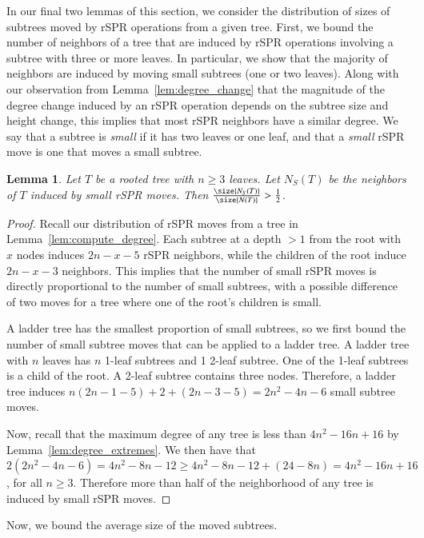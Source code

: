 \documentclass[]{elsarticle}
\newtheorem{lem}[thm]{Lemma}
\begin{document}
In our final two lemmas of this section, we consider the distribution of sizes of subtrees moved by rSPR operations from a given tree.
First, we bound the number of neighbors of a tree that are induced by rSPR operations involving a subtree with three or more leaves.
In particular, we show that the majority of neighbors are induced by moving small subtrees (one or two leaves).
Along with our observation from Lemma~\ref{lem:degree_change} that the magnitude of the degree change induced by an rSPR operation depends on the subtree size and height change, this implies that most rSPR neighbors have a similar degree.
	We say that a subtree is \emph{small} if it has two leaves or one leaf, and that a \emph{small} rSPR move is one that moves a small subtree.

\begin{lem}
	Let $T$ be a rooted tree with $n \ge 3$ leaves.
	Let $N_S(T)$ be the neighbors of $T$ induced by small rSPR moves.
	Then $\frac{\size{N_S(T)}}{\size{N(T)}} > \frac{1}{2}$.
	\label{lem:spr_size}
\end{lem}
\begin{proof}
	Recall our distribution of rSPR moves from a tree in Lemma~\ref{lem:compute_degree}.
	Each subtree at a depth $ > 1$ from the root with $x$ nodes induces $2n - x - 5$ rSPR neighbors, while the children of the root induce $2n - x - 3$ neighbors.
	This implies that the number of small rSPR moves is directly proportional to the number of small subtrees, with a possible difference of two moves for a tree where one of the root's children is small.

	A ladder tree has the smallest proportion of small subtrees, so we first bound the number of small subtree moves that can be applied to a ladder tree.
	A ladder tree with $n$ leaves has $n$ 1-leaf subtrees and 1 2-leaf subtree.
	One of the 1-leaf subtrees is a child of the root.
	A 2-leaf subtree contains three nodes.
	Therefore, a ladder tree induces $n (2n - 1 - 5) + 2 + (2n - 3 - 5) = 2n^2 - 4n - 6$ small subtree moves.

	Now, recall that the maximum degree of any tree is less than $4n^2 - 16n + 16$ by Lemma~\ref{lem:degree_extremes}.
	We then have that $2(2n^2 - 4n - 6) = 4n^2 - 8n - 12 \ge 4n^2 - 8n - 12 + (24 - 8n) = 4n^2 -16n + 16$, for all $n \ge 3$.
	Therefore more than half of the neighborhood of any tree is induced by small rSPR moves.
\end{proof}

Now, we bound the average size of the moved subtrees.
\end{document}
